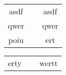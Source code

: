 \documentclass{article}
\begin{document}
\begin{landscape}
\begin{tabular}{ccc}
	asdf & \hspace{5cm} & asdf\\
	qwer & $\;$ & qwer\\
	poiu & $\;$ & ert

\end{tabular}
\end{landscape}
\newpage
\begin{landscape}
\begin{tabular}{ccc}
	erty & $\;$ & wertt
\end{tabular}
\end{landscape}
\end{document}
